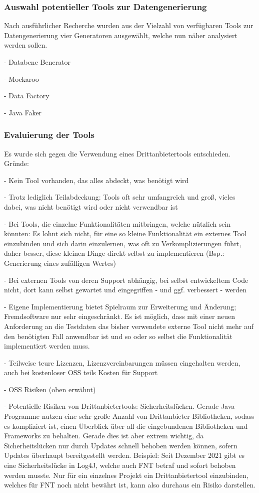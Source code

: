 \subsubsection*{Auswahl potentieller Tools zur Datengenerierung}\label{toolanalysauswahl}
Nach ausführlicher Recherche wurden aus der Vielzahl von verfügbaren Tools zur Datengenerierung vier Generatoren ausgewählt, welche nun näher analysiert werden sollen.

- Databene Benerator

- Mockaroo

- Data Factory

- Java Faker

\subsubsection*{Evaluierung der Tools}\label{toolanalysevaluierung}
Es wurde sich gegen die Verwendung eines Drittanbietertools entschieden. Gründe:

- Kein Tool vorhanden, das alles abdeckt, was benötigt wird

- Trotz lediglich Teilabdeckung: Tools oft sehr umfangreich und groß, vieles dabei, was nicht benötigt wird oder nicht verwendbar ist

- Bei Tools, die einzelne Funktionalitäten mitbringen, welche nützlich sein könnten: Es lohnt sich nicht, für eine so kleine Funktionalität ein externes Tool einzubinden und sich darin einzulernen, was oft zu Verkomplizierungen führt, daher besser, diese kleinen Dinge direkt selbst zu implementieren (Bsp.: Generierung eines zufälligen Wertes)

- Bei externen Tools von deren Support abhängig, bei selbst entwickeltem Code nicht, dort kann selbst gewartet und eingegriffen - und ggf. verbessert - werden

- Eigene Implementierung bietet Spielraum zur Erweiterung und Änderung; Fremdsoftware nur sehr eingeschränkt. Es ist möglich, dass mit einer neuen Anforderung an die Testdaten das bisher verwendete externe Tool nicht mehr auf den benötigten Fall anwendbar ist und so oder so selbst die Funktionalität implementiert werden muss.

- Teilweise teure Lizenzen, Lizenzvereinbarungen müssen eingehalten werden, auch bei kostenloser \ac{OSS} teils Kosten für Support \cite{singh:2015}\cite{veracode:2021}

- \ac{OSS} Risiken (oben erwähnt)

- Potentielle Risiken von Drittanbietertools: Sicherheitslücken. Gerade Java-Programme nutzen eine sehr große Anzahl von Drittanbieter-Bibliotheken, sodass es kompliziert ist, einen Überblick über all die eingebundenen Bibliotheken und Frameworks zu behalten. Gerade dies ist aber extrem wichtig, da Sicherheitslücken nur durch Updates schnell behoben werden können, sofern Updates überhaupt bereitgestellt werden. \cite{veracode:2021} Beispiel: Seit Dezember 2021 gibt es eine Sicherheitslücke in Log4J, welche auch FNT betraf und sofort behoben werden musste. \cite{mit:2021} Nur für ein einzelnes Projekt ein Drittanbietertool einzubinden, welches für FNT noch nicht bewährt ist, kann also durchaus ein Risiko darstellen.

